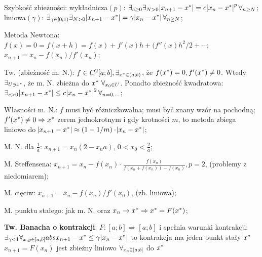 


\entry
Szybkość zbieżności:
wykładnicza$(p)$:
$\exists_{c \geq 0} \exists_{N > 0}
\abs{x_{n + 1} - x^{*}} = c \abs{x_n - x^{*}}^p \forall_{n \geq N}$;
liniowa$(\gamma)$:
$\exists_{\gamma \in [0;1)} \exists_{N > 0}
\abs{x_{n + 1} - x^{*}} = \gamma \abs{x_n - x^{*}} \forall_{n \geq N}$;

\entry
Metoda Newtona:
$f(x) = 0 = f(x+h) = f(x) + f'(x)h + (f''(x)h^2/2+\cdots$;
$x_{n+1} = x_n - f(x_n)/f'(x_n)$;

\entry
Tw. (zbieżność m. N.):
$f \in C^2[a;b], \exists_{x^{*} \in (a;b)}$,
że $f(x^{*})=0, f'(x^{*}) \neq 0$.
Wtedy $\exists_{U \ni x^{*}}$, że m. N. zbieżna do $x^{*} \ \forall_{x_0 \in U}$.
Ponadto zbieżność kwadratowa:
$\exists_{c>0} \abs{x_{n+1} - x^{*}} \leq c \abs{x_n - x^{*}}^2 \forall_{n=0,\ldots}$;

\entry
Własności m. N.:
\subentry
$f$ musi być różniczkowalna;
\subentry
musi być znany wzór na pochodną;
\subentry
$f'(x^{*}) \neq 0 \Rightarrow x^{*}$ zerem jednokrotnym i gdy krotności $m$,
to metoda zbiega liniowo do
$\abs{x_{n+1} - x^{*}} \approx (1-1/m) \cdot \abs{x_n - x^{*}}$;

\entry
M. N. dla
$\frac{1}{a}$: $x_{n+1} = x_n(2 - x_na)$, $0<x_0<\frac{2}{a}$;



\entry
M. Steffensena:
$x_{n+1} = x_n - f(x_n) \cdot \frac{f(x_n)}{f(x_n + f(x_n)) - f(x_n)}, p=2$,
(problemy z niedomiarem);

\entry
M. cięciw:
$x_{n+1} = x_n - f(x_n)/f'(x_0)$, (zb. liniowa);


\entry
M. punktu stałego:
jak m. N. oraz
$x_n \rightarrow x^{*} \Rightarrow x^{*} = F(x^{*})$;

\entry
\textbf{Tw. Banacha o kontrakcji}:
$F:[a;b] \Rightarrow [a;b]$
i spełnia warunki kontrakcji:
$\exists_{\gamma < 1} \forall_{x,y \in [a;b]} abs{x_{n+1} - x^{*}} \leq \gamma \abs{x_n - x^{*}}$
to kontrakcja ma jeden punkt stały $x^{*}$
$x_{n+1} = F(x_n)$
jest zbieżny liniowo
$\forall_{x_o \in [a;b]}$
do $x^{*}$
